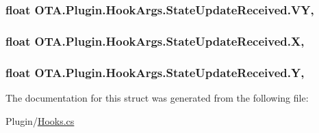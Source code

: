 \subsubsection[{V\+Y}]{\setlength{\rightskip}{0pt plus 5cm}float O\+T\+A.\+Plugin.\+Hook\+Args.\+State\+Update\+Received.\+V\+Y\hspace{0.3cm}{\ttfamily [get]}, {\ttfamily [set]}}\label{struct_o_t_a_1_1_plugin_1_1_hook_args_1_1_state_update_received_a6db0b19ecafbf35fd6c41efc80fbc7a3}
\hypertarget{struct_o_t_a_1_1_plugin_1_1_hook_args_1_1_state_update_received_ad5db1de5e1b40698fc4c4da1afc266eb}{}
\subsubsection[{X}]{\setlength{\rightskip}{0pt plus 5cm}float O\+T\+A.\+Plugin.\+Hook\+Args.\+State\+Update\+Received.\+X\hspace{0.3cm}{\ttfamily [get]}, {\ttfamily [set]}}\label{struct_o_t_a_1_1_plugin_1_1_hook_args_1_1_state_update_received_ad5db1de5e1b40698fc4c4da1afc266eb}
\hypertarget{struct_o_t_a_1_1_plugin_1_1_hook_args_1_1_state_update_received_ad6cb32461b788025f100c3ee228ec080}{}
\subsubsection[{Y}]{\setlength{\rightskip}{0pt plus 5cm}float O\+T\+A.\+Plugin.\+Hook\+Args.\+State\+Update\+Received.\+Y\hspace{0.3cm}{\ttfamily [get]}, {\ttfamily [set]}}\label{struct_o_t_a_1_1_plugin_1_1_hook_args_1_1_state_update_received_ad6cb32461b788025f100c3ee228ec080}


The documentation for this struct was generated from the following file\+:\begin{DoxyCompactItemize}
\item 
Plugin/\hyperlink{_hooks_8cs}{Hooks.\+cs}\end{DoxyCompactItemize}
